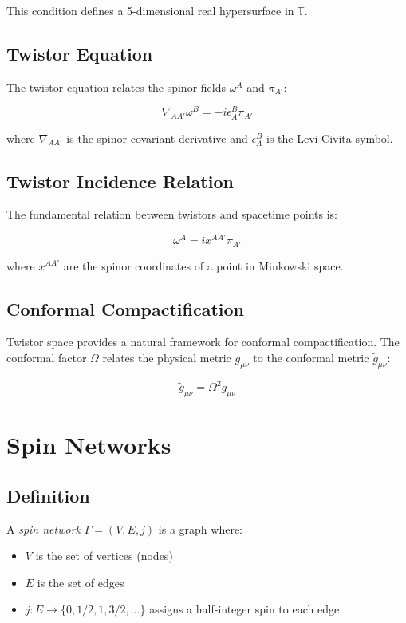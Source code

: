 \documentclass[12pt,a4paper]{article}
\begin{document}
This condition defines a 5-dimensional real hypersurface in $\mathbb{T}$.

\subsection{Twistor Equation}

The twistor equation relates the spinor fields $\omega^A$ and $\pi_{A'}$:

\begin{equation}
\nabla_{AA'} \omega^B = -i \epsilon_A^B \pi_{A'}
\end{equation}

where $\nabla_{AA'}$ is the spinor covariant derivative and $\epsilon_A^B$ is the Levi-Civita symbol.

\subsection{Twistor Incidence Relation}

The fundamental relation between twistors and spacetime points is:

\begin{equation}
\omega^A = i x^{AA'} \pi_{A'}
\end{equation}

where $x^{AA'}$ are the spinor coordinates of a point in Minkowski space.

\subsection{Conformal Compactification}

Twistor space provides a natural framework for conformal compactification. The conformal factor $\Omega$ relates the physical metric $g_{\mu\nu}$ to the conformal metric $\tilde{g}_{\mu\nu}$:

\begin{equation}
\tilde{g}_{\mu\nu} = \Omega^2 g_{\mu\nu}
\end{equation}

\section{Spin Networks}

\subsection{Definition}

A \textit{spin network} $\Gamma = (V, E, j)$ is a graph where:
\begin{itemize}
    \item $V$ is the set of vertices (nodes)
    \item $E$ is the set of edges
    \item $j: E \to \{0, 1/2, 1, 3/2, \ldots\}$ assigns a half-integer spin to each edge
\end{itemize}
\end{document}
